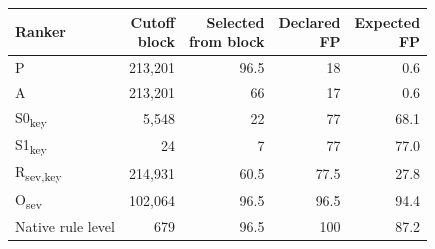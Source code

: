 \begin{tabular}{lrrrr}
\toprule
Ranker & \shortstack{Cutoff\\block} & \shortstack{Selected\\from block} & \shortstack{Declared\\FP} & \shortstack{Expected\\FP} \\
\midrule
P & 213,201 & 96.5 & 18 & 0.6 \\
A & 213,201 & 66 & 17 & 0.6 \\
S0\textsubscript{key} & 5,548 & 22 & 77 & 68.1 \\
S1\textsubscript{key} & 24 & 7 & 77 & 77.0 \\
R\textsubscript{sev,key} & 214,931 & 60.5 & 77.5 & 27.8 \\
O\textsubscript{sev} & 102,064 & 96.5 & 96.5 & 94.4 \\
Native rule level & 679 & 96.5 & 100 & 87.2 \\
\bottomrule
\end{tabular}
